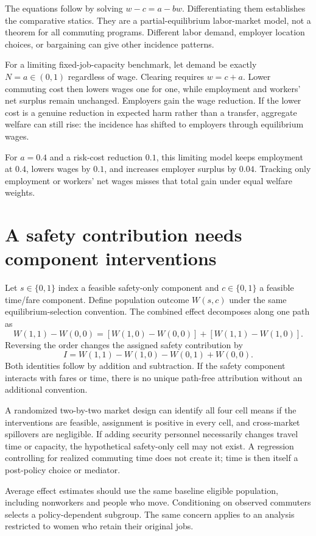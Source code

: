 \documentclass[11pt,a4paper]{article}
\begin{document}
The equations follow by solving $w-c=a-bw$. Differentiating them establishes the comparative statics. They are a partial-equilibrium labor-market model, not a theorem for all commuting programs. Different labor demand, employer location choices, or bargaining can give other incidence patterns.

For a limiting fixed-job-capacity benchmark, let demand be exactly $N=a\in(0,1)$ regardless of wage. Clearing requires $w=c+a$. Lower commuting cost then lowers wages one for one, while employment and workers' net surplus remain unchanged. Employers gain the wage reduction. If the lower cost is a genuine reduction in expected harm rather than a transfer, aggregate welfare can still rise: the incidence has shifted to employers through equilibrium wages.

For $a=0.4$ and a risk-cost reduction $0.1$, this limiting model keeps employment at $0.4$, lowers wages by $0.1$, and increases employer surplus by $0.04$. Tracking only employment or workers' net wages misses that total gain under equal welfare weights.
\section{A safety contribution needs component interventions}
Let $s\in\{0,1\}$ index a feasible safety-only component and $c\in\{0,1\}$ a feasible time/fare component. Define population outcome $W(s,c)$ under the same equilibrium-selection convention. The combined effect decomposes along one path as
\[
 W(1,1)-W(0,0)
 =[W(1,0)-W(0,0)]+[W(1,1)-W(1,0)].
\]
Reversing the order changes the assigned safety contribution by
\[
 I=W(1,1)-W(1,0)-W(0,1)+W(0,0).
 \tag{4}
\]
Both identities follow by addition and subtraction. If the safety component interacts with fares or time, there is no unique path-free attribution without an additional convention.

A randomized two-by-two market design can identify all four cell means if the interventions are feasible, assignment is positive in every cell, and cross-market spillovers are negligible. If adding security personnel necessarily changes travel time or capacity, the hypothetical safety-only cell may not exist. A regression controlling for realized commuting time does not create it; time is then itself a post-policy choice or mediator.

Average effect estimates should use the same baseline eligible population, including nonworkers and people who move. Conditioning on observed commuters selects a policy-dependent subgroup. The same concern applies to an analysis restricted to women who retain their original jobs.
\end{document}
